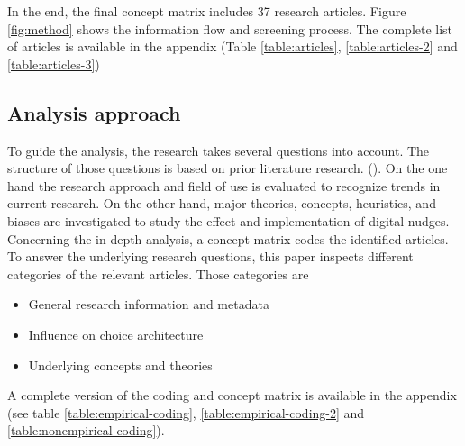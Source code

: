 In the end, the final concept matrix includes 37 research articles. Figure \ref{fig:method} shows the information flow and screening process. The complete list of articles is available in the appendix (Table \ref{table:articles}, \ref{table:articles-2} and \ref{table:articles-3})

\subsection{Analysis approach}
To guide the analysis, the research takes several questions into account. The structure of those questions is based on prior literature research. (\cite{alavi_review_1992}). On the one hand the research approach and field of use is evaluated to recognize trends in current research. On the other hand, major theories, concepts, heuristics, and biases are investigated to study the effect and implementation of digital nudges.
Concerning the in-depth analysis, a concept matrix codes the identified articles. To answer the underlying research questions, this paper inspects different categories of the relevant articles. Those categories are 
\begin{itemize}
\item General research information and metadata
\item Influence on choice architecture
\item Underlying concepts and theories
\end{itemize}

A complete version of the coding and concept matrix is available in the appendix (see table \ref{table:empirical-coding}, \ref{table:empirical-coding-2} and \ref{table:nonempirical-coding}).